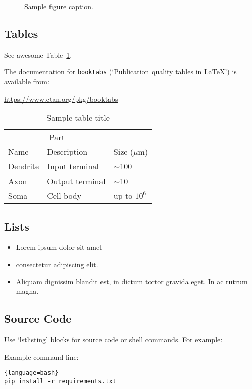 \documentclass{article}
\begin{document}
\begin{figure}[h]
	\centering
	\fbox{\rule[-.5cm]{4cm}{4cm} \rule[-.5cm]{4cm}{0cm}}
	\caption{Sample figure caption.}
	\label{fig:fig1}
\end{figure}

\subsection{Tables}
See awesome Table~\ref{tab:table}.

The documentation for \verb+booktabs+ (`Publication quality tables in LaTeX') is available from:
\begin{center}
	\url{https://www.ctan.org/pkg/booktabs}
\end{center}


\begin{table}[h]
	\caption{Sample table title}
	\centering
	\begin{tabular}{lll}
		\toprule
		\multicolumn{2}{c}{Part}                   \\
		\cmidrule(r){1-2}
		Name     & Description     & Size ($\mu$m) \\
		\midrule
		Dendrite & Input terminal  & $\sim$100     \\
		Axon     & Output terminal & $\sim$10      \\
		Soma     & Cell body       & up to $10^6$  \\
		\bottomrule
	\end{tabular}
	\label{tab:table}
\end{table}

\subsection{Lists}
\begin{itemize}
	\item Lorem ipsum dolor sit amet
	\item consectetur adipiscing elit.
	\item Aliquam dignissim blandit est, in dictum tortor gravida eget. In ac rutrum magna.
\end{itemize}

\subsection{Source Code}
Use `lstlisting' blocks for source code or shell commands. For example:

Example command line: 
\begin{lstlisting}{language=bash}
pip install -r requirements.txt 
\end{lstlisting}
\end{document}
